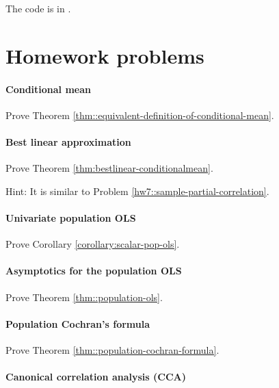 The  code is in . 


\section{Homework problems}

\paragraph{Conditional mean}\label{hw11::population-mean}

Prove Theorem \ref{thm::equivalent-definition-of-conditional-mean}. 

\paragraph{Best linear approximation}\label{hw11::condition-mean-app}

Prove Theorem \ref{thm:bestlinear-conditionalmean}.

Hint: It is similar to Problem \ref{hw7::sample-partial-correlation}.

\paragraph{Univariate population OLS}\label{hw11::univariate-ols}

Prove Corollary \ref{corollary:scalar-pop-ols}.

\paragraph{Asymptotics for the population OLS}\label{hw11::population-ols-asymptotics}

Prove Theorem \ref{thm::population-ols}. 


\paragraph{Population Cochran's formula}\label{hw11::population-cochran}

Prove Theorem \ref{thm::population-cochran-formula}. 


\paragraph{Canonical correlation analysis (CCA)}\label{hw11::cca}

